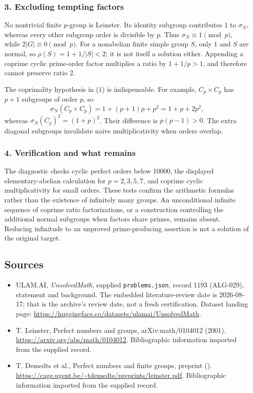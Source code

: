 \documentclass[11pt,a4paper]{article}
\begin{document}
\subsubsection{3. Excluding tempting factors}
No nontrivial finite $p$-group is Leinster. Its identity subgroup contributes 1 to $\sigma_N$, whereas every other subgroup order is divisible by $p$. Thus $\sigma_N\equiv1\pmod p$, while $2|G|\equiv0\pmod p$. For a nonabelian finite simple group $S$, only $1$ and $S$ are normal, so $\rho(S)=1+1/|S|<2$; it is not itself a solution either. Appending a coprime cyclic prime-order factor multiplies a ratio by $1+1/p>1$, and therefore cannot preserve ratio 2.

The coprimality hypothesis in (1) is indispensable. For example, $C_p\times C_p$ has $p+1$ subgroups of order $p$, so
\[\sigma_N(C_p\times C_p)=1+(p+1)p+p^2=1+p+2p^2,
\]
whereas $\sigma_N(C_p)^2=(1+p)^2$. Their difference is $p(p-1)>0$. The extra diagonal subgroups invalidate naive multiplicativity when orders overlap.

\subsubsection{4. Verification and what remains}
The diagnostic checks cyclic perfect orders below 10000, the displayed elementary-abelian calculation for $p=2,3,5,7$, and coprime cyclic multiplicativity for small orders. These tests confirm the arithmetic formulas rather than the existence of infinitely many groups. An unconditional infinite sequence of coprime ratio factorizations, or a construction controlling the additional normal subgroups when factors share primes, remains absent. Reducing infinitude to an unproved prime-producing assertion is not a solution of the original target.

\subsection{Sources}

{\small

\begin{itemize}

\item[\hypertarget{source:1193:1}{S1}] ULAM.AI, \emph{UnsolvedMath}, supplied \texttt{problems.json}, record 1193 (ALG-029), statement and background. The embedded literature-review date is 2026-08-17; that is the archive’s review date, not a fresh certification. Dataset landing page: \url{https://huggingface.co/datasets/ulamai/UnsolvedMath}.

\item[\hypertarget{source:1193:2}{S2}] T. Leinster, Perfect numbers and groups, arXiv:math/0104012 (2001). \url{https://arxiv.org/abs/math/0104012}. Bibliographic information imported from the supplied record.

\item[\hypertarget{source:1193:3}{S3}] T. Demedts et al., Perfect numbers and finite groups, preprint (). \url{https://cage.ugent.be/~tdemedts/preprints/leinster.pdf}. Bibliographic information imported from the supplied record.

\end{itemize}

}

\label{end:1193}
\end{document}
